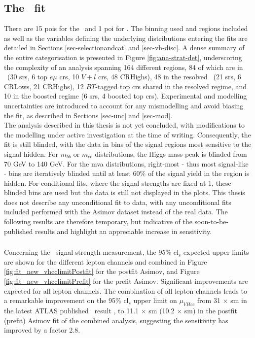 \subsection[The \vhbc\ Fit]{The \boldvhbc\ fit}\label{subsec-subsecVHBCfit}
There are 15 \glspl{poi} for the \vhb\ and 1 \gls{poi} for \vhc. The binning used and regions included as well as the variables defining the underlying distributions entering the fits are detailed in Sections \ref{sec-selectionandcat} and \ref{sec-vh-disc}. A dense summary of the entire categorisation is presented in Figure \ref{fig:ana-strat-det}, underscoring the complexity of an analysis spanning 164 different regions, 84 of which are in \vhc\ (30 \glspl{sr}, 6 top $e\mu$ \glspl{cr}, 10 $V+l$ \glspl{cr}, 48 CRHighs), 48 in the resolved \vhb\ (21 \glspl{sr}, 6 CRLows, 21 CRHighs), 12 $BT$-tagged top \glspl{cr} shared in the resolved regime, and 10 in the boosted regime (6 \glspl{sr}, 4 boosted top \glspl{cr}). Experimental and modelling uncertainties are introduced to account for any mismodelling and avoid biasing the fit, as described in Sections \ref{sec-unc} and \ref{sec-mod}. \\

The analysis described in this thesis is not yet concluded, with modifications to the modelling under active investigation at the time of writing. Consequently, the fit is still blinded, with the data in bins of the signal regions most sensitive to the signal hidden. For $m_{bb}$ or $m_{cc}$ distributions, the Higgs mass peak is blinded from 70 GeV to 140 GeV. For the \gls{mva} distributions, right-most - thus most signal-like - bins are iteratively blinded until at least 60\% of the signal yield in the region is hidden. For conditional fits, where the signal strengths are fixed at 1, these blinded bins are used but the data is still not displayed in the plots. This thesis does not describe any unconditional fit to data, with any unconditional fits included performed with the Asimov dataset instead of the real data. The following results are therefore temporary, but indicative of the soon-to-be-published results and highlight an appreciable increase in sensitivity. 

\subsubsection{\boldvhc}
Concerning the \vhc\ signal strength measurement, the 95\% \gls{cl}$_s$ expected upper limits are shown for the different lepton channels and combined in Figure \ref{fig:fit_new_vhcclimitPostfit} for the postfit Asimov, and Figure \ref{fig:fit_new_vhcclimitPrefit} for the prefit Asimov. Significant improvements are expected for all lepton channels. The combination of all lepton channels leads to a remarkable improvement on the 95\% \gls{cl}$_s$ upper limit on $\mu_{VHcc}$ from 31 $\times$ \gls{sm} in the latest ATLAS published \vhc\ result \cite{Collaboration:2721696}, to 11.1 $\times$ \gls{sm} (10.2 $\times$ \gls{sm}) in the postfit (prefit) Asimov fit of the combined analysis, suggesting the sensitivity has improved by a factor 2.8. \\

